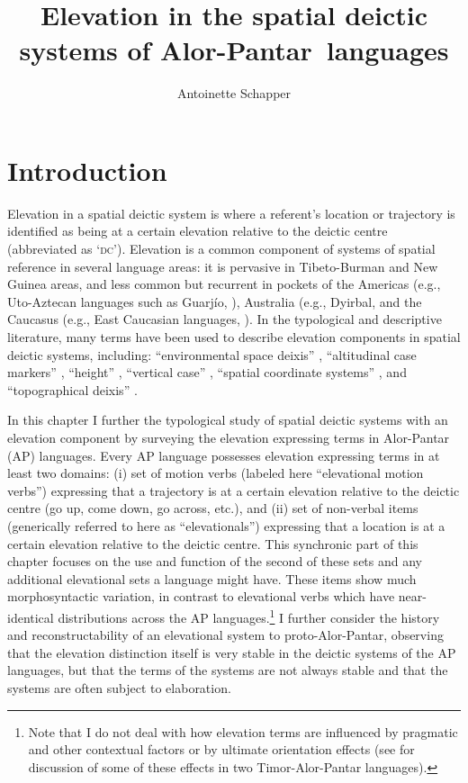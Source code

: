 \documentclass[output=paper]{LSP/langsci}
\title{Elevation in the spatial deictic systems of Alor-Pantar~languages}
\author{Antoinette Schapper}
\begin{document}
\section{Introduction} 


Elevation in a spatial deictic system is where a referent's location or trajectory is identified as being at a certain elevation relative to the deictic centre (abbreviated as `\textsc{dc}'). Elevation is a common component of systems of spatial reference in several language areas: it is pervasive in Tibeto-Burman \citep{Bickel2001,Cheung2007,Post2011} and New Guinea \citep{Senft1997,Senft2004,Diessel1999,Levinson1983} areas, and less common but recurrent in pockets of the Americas (e.g., Uto-Aztecan languages such as Guarj\'io, \citet{Miller1996}), Australia (e.g., Dyirbal, \citet[48]{Dixon1972} and the Caucasus (e.g., East Caucasian languages, \citet{Schulze2003}). In the typological and descriptive literature, many terms have been used to describe elevation components in spatial deictic systems, including: ``environmental space deixis'' \citep{Bickel2001}, ``altitudinal case markers'' \citep{Ebert2003}, ``height'' \citep{Dixon2003}, ``vertical case'' \citep{Noonan2006}, ``spatial coordinate systems'' \citep{Burenhult2008}, and ``topographical deixis'' \citep{Post2011}. 

In this chapter I further the typological study of spatial deictic systems with an elevation component by surveying the elevation expressing terms in Alor-Pantar (AP) languages. Every AP language possesses elevation expressing terms in at least two domains: (i) set of motion verbs (labeled here ``elevational motion verbs'') expressing that a trajectory is at a certain elevation relative to the deictic centre (go up, come down, go across, etc.), and (ii) set of non-verbal items (generically referred to here as ``elevationals'') expressing that a location is at a certain elevation relative to the deictic centre. This synchronic part of this chapter focuses on the use and function of the second of these sets and any additional elevational sets a language might have. These items show much morphosyntactic variation, in contrast to elevational verbs which have near-identical distributions across the AP languages.\footnote{Note that I do not deal with how elevation terms are influenced by pragmatic and other contextual factors or by ultimate orientation effects (see \citet{Schapper2012} for discussion of some of these effects in two Timor-Alor-Pantar languages).} I further consider the history and reconstructability of an elevational system to proto-Alor-Pantar, observing that the elevation distinction itself is very stable in the deictic systems of the AP languages, but that the terms of the systems are not always stable and that the systems are often subject to elaboration. 
\end{document}
